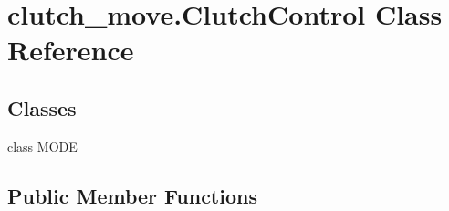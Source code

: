 \hypertarget{classclutch__move_1_1ClutchControl}{\section{clutch\-\_\-move.\-Clutch\-Control Class Reference}
\label{classclutch__move_1_1ClutchControl}
}
\subsection*{Classes}
\begin{DoxyCompactItemize}
\item 
class \hyperlink{classclutch__move_1_1ClutchControl_1_1MODE}{M\-O\-D\-E}
\end{DoxyCompactItemize}
\subsection*{Public Member Functions}
